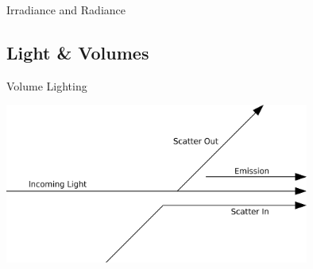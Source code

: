 \documentclass[10pt,compress,professionalfont]{beamer}
\begin{document}
\begin{frame}{Irradiance and Radiance}

\end{frame}



\subsection{Light \& Volumes}
\begin{frame}{Volume Lighting}

    \centering
    \vspace{0cm}
    \includegraphics[width=100mm]{../img/diag/vol_scatter.pdf}

\end{frame}
\end{document}

